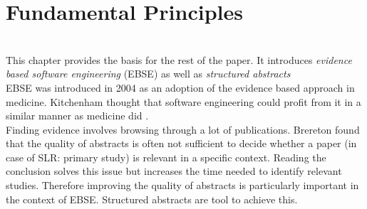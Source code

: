 
\section {Fundamental Principles}
\label{sec:fundamental principles}
\\
This chapter provides the basis for the rest of the paper. It introduces \emph{evidence based software engineering} (EBSE) as well as \emph{structured abstracts} \\
EBSE was introduced in 2004 as an adoption of the evidence based approach in medicine. Kitchenham \etal thought that software engineering could profit from it in a similar manner as medicine did \cite{EBSE}.\\
Finding evidence involves browsing through a lot of publications.  Brereton \etal found that the quality of abstracts is often not sufficient to decide whether a paper (in case of SLR: primary study) is relevant in a specific context. Reading the conclusion solves this issue but increases the time needed to identify relevant studies. Therefore improving the quality of abstracts is  particularly important in the context of EBSE. Structured abstracts are tool to achieve this.


